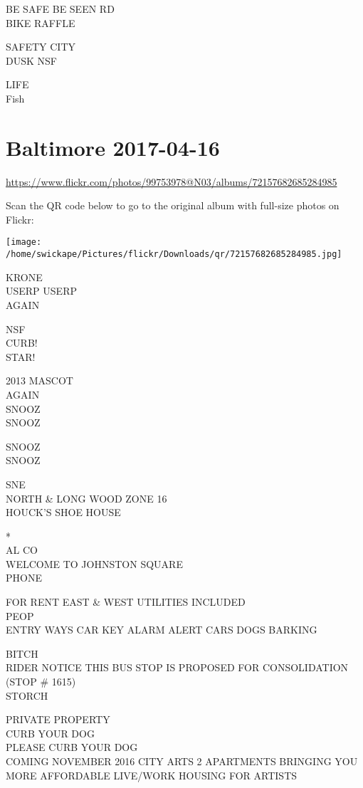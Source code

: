 \documentclass[10pt,letterpaper]{article}
\begin{document}
BE SAFE BE SEEN RD\\
BIKE RAFFLE

SAFETY CITY\\
DUSK NSF

LIFE\\
Fish


\section*{Baltimore 2017-04-16}

\url{https://www.flickr.com/photos/99753978@N03/albums/72157682685284985}

Scan the QR code below to go to the original album with full-size photos on Flickr:

\texttt{[image: /home/swickape/Pictures/flickr/Downloads/qr/72157682685284985.jpg]}


KRONE\\
USERP USERP\\
AGAIN

NSF\\
CURB!\\
STAR!

2013 MASCOT\\
AGAIN\\
SNOOZ\\
SNOOZ

SNOOZ\\
SNOOZ

SNE\\
NORTH \& LONG WOOD ZONE 16\\
HOUCK'S SHOE HOUSE

*\\
AL CO\\
WELCOME TO JOHNSTON SQUARE\\
PHONE

FOR RENT EAST \& WEST UTILITIES INCLUDED\\
PEOP\\
ENTRY WAYS CAR KEY ALARM ALERT CARS DOGS BARKING

BITCH\\
RIDER NOTICE THIS BUS STOP IS PROPOSED FOR CONSOLIDATION (STOP \# 1615)\\
STORCH

PRIVATE PROPERTY\\
CURB YOUR DOG\\
PLEASE CURB YOUR DOG\\
COMING NOVEMBER 2016 CITY ARTS 2 APARTMENTS BRINGING YOU MORE AFFORDABLE LIVE/WORK HOUSING FOR ARTISTS
\end{document}

